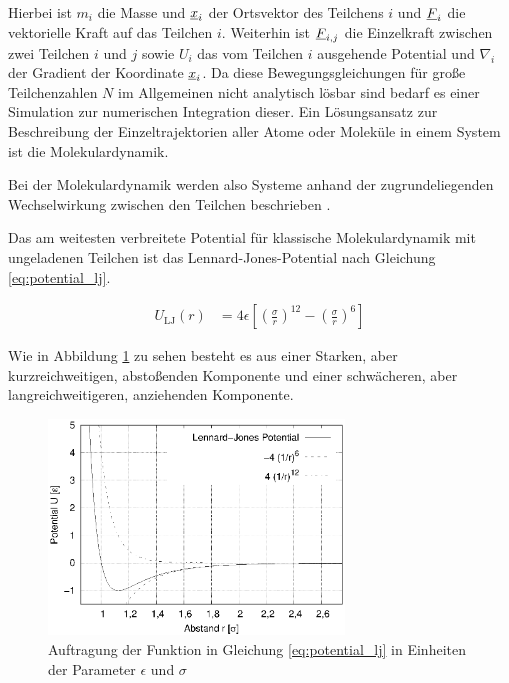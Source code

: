 		Hierbei ist $m_i$ die Masse und $\underline{x}_i$ der Ortsvektor des Teilchens $i$ und
		$\underline{F}_{i}$ die vektorielle Kraft auf das Teilchen $i$. Weiterhin ist $\underline{F}_{i,j}$
		die Einzelkraft zwischen zwei Teilchen $i$ und $j$ sowie $U_i$ das vom Teilchen $i$
		ausgehende Potential und $\nabla_i$ der Gradient der Koordinate $\underline{x}_i$. Da diese
		Bewegungsgleichungen für große Teilchenzahlen $N$ im Allgemeinen nicht analytisch lösbar
		sind  bedarf es einer Simulation zur
		numerischen Integration dieser. Ein Lösungsansatz zur Beschreibung der Einzeltrajektorien
		aller Atome oder Moleküle in einem System ist die Molekulardynamik.

		Bei der Molekulardynamik werden also Systeme anhand der zugrundeliegenden Wechselwirkung
		zwischen den Teilchen beschrieben \cite{allen2004introduction}.

		Das am weitesten verbreitete Potential für klassische Molekulardynamik mit ungeladenen
		Teilchen ist das Lennard-Jones-Potential nach Gleichung \eqref{eq:potential_lj}.

		\begin{align}
			U_\text{LJ}(r) &= 4\epsilon \left[
				\left(\frac{\sigma}{r}\right)^{12}
				-
				\left(\frac{\sigma}{r}\right)^{6}
			\right] \label{eq:potential_lj}
		\end{align}

		Wie in Abbildung \ref{fig:potential_lj} zu sehen besteht es aus einer Starken, aber kurzreichweitigen, abstoßenden
		Komponente und einer schwächeren, aber langreichweitigeren, anziehenden Komponente.

		\begin{figure}[ht]
			\centering
			\includegraphics[width=0.7\textwidth]{chapter/main/plt/lennard_jones.eps}
			\caption{Auftragung der Funktion in Gleichung \eqref{eq:potential_lj} in Einheiten
			der Parameter $\epsilon$ und $\sigma$}
			\label{fig:potential_lj}
		\end{figure}

